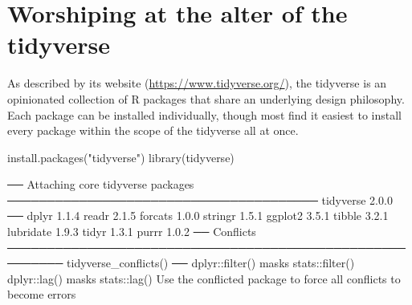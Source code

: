 
\section{Worshiping at the alter of the tidyverse}
\label{sec:tidyverse}

As described by its website (\url{https://www.tidyverse.org/}), the \gls{tidyverse} is an opinionated collection of R packages that share an underlying design philosophy. Each package can be installed individually, though most find it easiest to install every package within the scope of the tidyverse all at once.


\begin{inR}
install.packages("tidyverse")
library(tidyverse)
\end{inR}


\begin{outR}
── Attaching core tidyverse packages ─────────────────────────────────────── tidyverse 2.0.0 ──
dplyr     1.1.4     readr     2.1.5
forcats   1.0.0     stringr   1.5.1
ggplot2   3.5.1     tibble    3.2.1
lubridate 1.9.3     tidyr     1.3.1
purrr     1.0.2     
── Conflicts ───────────────────────────────────────────────────────── tidyverse_conflicts() ──
dplyr::filter() masks stats::filter()
dplyr::lag()    masks stats::lag()
Use the conflicted package to force all conflicts to become errors
\end{outR}

